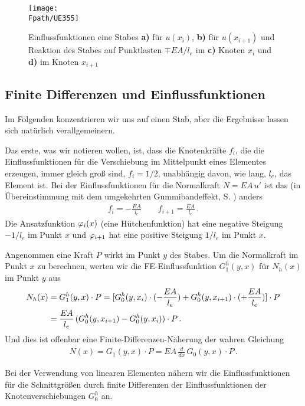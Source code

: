 \begin{figure}
\centering
\if {} \sidecaption \fi
\texttt{[image: \\Fpath/UE355]}
\caption{Einflussfunktionen eine Stabes \textbf{ a)} f\"{u}r $u(x_i)$, \textbf{ b)} f\"{u}r $u(x_{i+1})$ und Reaktion des Stabes auf Punktlasten $\mp EA/l_e$ im \textbf{ c)} Knoten $x_i$ und \textbf{ d)} im Knoten $x_{i+1}$}
\label{UE355}%
\end{figure}%

{\textcolor{sectionTitleBlue}{\section{Finite Differenzen und Einflussfunktionen}}}
Im Folgenden konzentrieren wir uns auf einen Stab, aber die Ergebnisse lassen sich nat\"{u}rlich verallgemeinern.

Das erste, was wir notieren wollen, ist, dass die Knotenkr\"{a}fte $f_i$, die die Einflussfunktionen f\"{u}r die Verschiebung im Mittelpunkt eines Elementes erzeugen, immer gleich gro{\ss} sind, $f_i = 1/2$, unabh\"{a}ngig davon, wie lang, $l_e$, das Element ist. Bei der Einflussfunktionen f\"{u}r die Normalkraft $N = EA\,u'$ ist das (in \"{U}bereinstimmung mit dem umgekehrten Gummibandeffekt, S. \pageref{rubberband}) anders
\begin{align}
f_i = -\frac{EA}{l_e} \qquad f_{i+1} = \frac{EA}{l_e}\,.
\end{align}
Die Ansatzfunktion $\varphi_i(x)$ (eine H\"{u}tchenfunktion) hat eine negative Steigung $-1/l_e$ im Punkt $x$ und $\varphi_{i+1}$ hat eine positive Steigung $1/l_e$ im Punkt $x$.

Angenommen eine Kraft $P$ wirkt im Punkt $y$ des Stabes. Um die Normalkraft im Punkt $x$ zu berechnen, werten wir die FE-Einflussfunktion $G_1^h(y,x)$ f\"{u}r $N_h(x)$ im Punkt $y$ aus
\begin{align}
N_h(x) &= G_1^h(y,x) \cdot P = [G_0^h(y,x_i) \cdot (-\frac{EA}{l_e}) + G_0^h(y,x_{i+1}) \cdot (+\frac{EA}{l_e})] \cdot P\nonumber \\
 &= \frac{EA}{l_e}\,(G_0^h(y,x_{i+1}) - G_0^h(y,x_i)) \cdot P\,.
\end{align}
Und dies ist offenbar eine Finite-Differenzen-N\"{a}herung der wahren Gleichung
\begin{align}
N(x) = G_1(y,x)\cdot P = EA\,\frac{d}{dx}\,G_0(y,x) \cdot P\,.
\end{align}
\hspace*{0pt}\colorbox{highlightBlue}{\parbox{0.98\textwidth}{Bei der Verwendung von linearen Elementen n\"{a}hern wir die Einflussfunktionen f\"{u}r die Schnittgr\"{o}{\ss}en durch finite Differenzen der Einflussfunktionen der Knotenverschiebungen $G_0^h$ an.}}\\

